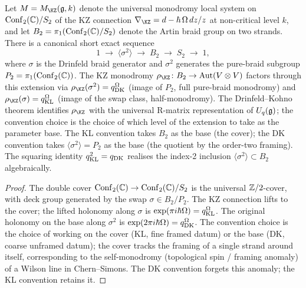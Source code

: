 \begin{theorem}
\label{thm:q-bridge-cocycle}
\ClaimStatusProvedHere
Let $M = M_{\KZ}(\fg, k)$ denote the universal monodromy local
system on $\mathrm{Conf}_{2}(\mathbb{C})/S_{2}$ of the KZ connection
$\nabla_{\KZ} = d - \hbar\, \Omega \, dz/z$ at non-critical level
$k$, and let $B_{2} = \pi_{1}(\mathrm{Conf}_{2}(\mathbb{C})/S_{2})$ denote the
Artin braid group on two strands. There is a canonical short
exact sequence
\[
1 \;\to\; \langle \sigma^{2} \rangle \;\to\; B_{2} \;\to\; S_{2}
\;\to\; 1,
\]
where $\sigma$ is the Drinfeld braid generator and
$\sigma^{2}$ generates the pure-braid subgroup $P_{2} =
\pi_{1}(\mathrm{Conf}_{2}(\mathbb{C}))$. The KZ monodromy
$\rho_{\KZ} \colon B_{2} \to \mathrm{Aut}(V \otimes V)$ factors
through this extension via $\rho_{\KZ}(\sigma^{2}) = q_{\DK}^{\Omega}$
(image of $P_{2}$, full pure-braid monodromy) and
$\rho_{\KZ}(\sigma) = q_{\KL}^{\Omega}$ (image of the swap class,
half-monodromy). The Drinfeld--Kohno theorem identifies
$\rho_{\KZ}$ with the universal R-matrix representation of
$U_{q}(\mathfrak{g})$; the convention choice is the choice of which
level of the extension to take as the parameter base. The KL
convention takes $B_{2}$ as the base (the cover); the DK
convention takes $\langle \sigma^{2} \rangle = P_{2}$ as the base
(the quotient by the order-two framing). The squaring identity
$q_{\mathrm{KL}}^{2} = q_{\mathrm{DK}}$ realises the index-2 inclusion
$\langle \sigma^{2} \rangle \subset B_{2}$ algebraically.
\end{theorem}

\begin{proof}
The double cover $\mathrm{Conf}_{2}(\mathbb{C}) \to \mathrm{Conf}_{2}(\mathbb{C})/S_{2}$ is
the universal $\mathbb{Z}/2$-cover, with deck group generated by the
swap $\sigma \in B_{2}/P_{2}$. The KZ connection lifts to the
cover; the lifted holonomy along $\sigma$ is $\exp(\pi i \hbar
\Omega) = q_{\mathrm{KL}}^{\Omega}$. The original holonomy on the base
along $\sigma^{2}$ is $\exp(2\pi i \hbar \Omega) =
q_{\mathrm{DK}}^{\Omega}$. The convention choice is the choice of working
on the cover (KL, fine framed datum) or the base (DK, coarse
unframed datum); the cover tracks the framing of a single strand
around itself, corresponding to the self-monodromy (topological
spin / framing anomaly) of a Wilson line in Chern--Simons. The
DK convention forgets this anomaly; the KL convention retains
it.
\end{proof}

